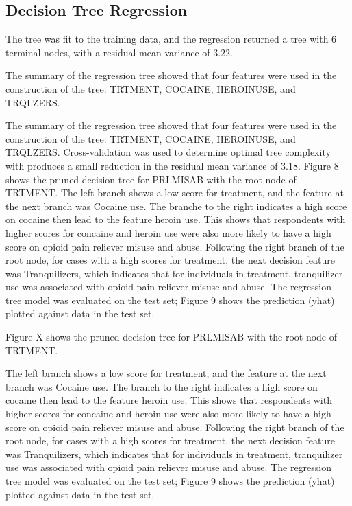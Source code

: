\documentclass[sigconf]{acmart}
\begin{document}

\subsection{Decision Tree Regression}

The tree was fit to the training data, and the regression returned a tree with 
6 terminal nodes, with a residual mean variance of 3.22. 

The summary of the regression tree showed that four features were used in the 
construction of the tree: TRTMENT, COCAINE, HEROINUSE, and TRQLZERS. 

The summary of the 
regression tree showed that four features were used in the construction of 
the tree: TRTMENT, COCAINE, HEROINUSE, and TRQLZERS. Cross-validation 
was used to determine optimal tree complexity with produces a small reduction
in the residual mean variance of 3.18. Figure 8 shows the pruned decision tree 
for PRLMISAB with the root node of TRTMENT. The left branch shows a low 
score for treatment, and the feature at the next branch was Cocaine use. 
The branche to the right indicates a high score on cocaine then lead to 
the feature heroin use. This shows that respondents with higher scores for 
concaine and heroin use were also more likely to have a high score on 
opioid pain reliever misuse and abuse. Following the right branch of the 
root node, for cases with a high scores for treatment, the next decision 
feature was Tranquilizers, which indicates that for individuals in treatment, 
tranquilizer use was associated with opioid pain reliever misuse and abuse. 
The regression tree model was evaluated on the test set; Figure 9 shows 
the prediction (yhat) plotted against data in the test set.




Figure X shows the 
pruned decision tree for PRLMISAB with the root node of TRTMENT. 

The left branch shows a low score for treatment, and the feature at the next 
branch was Cocaine use. 
The branch to the right indicates a high score on cocaine then lead to 
the feature heroin use. This shows that respondents with higher scores for 
concaine and heroin use were also more likely to have a high score on 
opioid pain reliever misuse and abuse. Following the right branch of the 
root node, for cases with a high scores for treatment, the next decision 
feature was Tranquilizers, which indicates that for individuals in treatment, 
tranquilizer use was associated with opioid pain reliever misuse and abuse. 
The regression tree model was evaluated on the test set; Figure 9 shows 
the prediction (yhat) plotted against data in the test set.
\end{document}
